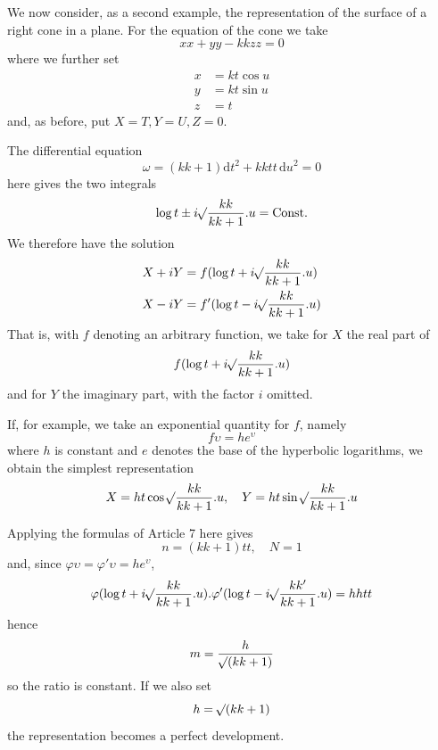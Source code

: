 We now consider, as a second example, the representation of the surface of a right cone in a plane. For the equation of the cone we take
\[
xx+yy-kkzz=0
\]
\noindent where we further set
\[
\begin{aligned}
x&=kt\cos u\\
y&=kt\sin u\\
z&=t
\end{aligned}
\]
\noindent and, as before, put \(X=T,Y=U,Z=0\).

The differential equation
\[
\omega=(kk+1)\mathrm{d}t^2+kktt\,\mathrm{d}u^2=0
\]
\noindent here gives the two integrals
\[
\log t\pm i\mathord{{}^{}\!\surd}\frac{kk}{kk+1}\mathord{.}u=\text{Const.}
\]
\noindent We therefore have the solution
\[
\begin{aligned}
X+iY&=f(\log t+i\mathord{{}^{}\!\surd}\frac{kk}{kk+1}\mathord{.}u)\\
X-iY&=f'(\log t-i\mathord{{}^{}\!\surd}\frac{kk}{kk+1}\mathord{.}u)
\end{aligned}
\]
\noindent That is, with \(f\) denoting an arbitrary function, we take for \(X\) the real part of
\[
f(\log t+i\mathord{{}^{}\!\surd}\frac{kk}{kk+1}\mathord{.}u)
\]
\noindent and for \(Y\) the imaginary part, with the factor \(i\) omitted.
\par\indent{}%
If, for example, we take an exponential quantity for \(f\), namely
\[
f\upsilon=he^{\upsilon}
\]
\noindent where \(h\) is constant and \(e\) denotes the base of the hyperbolic logarithms, we obtain the simplest representation
\[
X=ht\cos\mathord{{}^{}\!\surd}\frac{kk}{kk+1}\mathord{.}u,\quad
Y=ht\sin\mathord{{}^{}\!\surd}\frac{kk}{kk+1}\mathord{.}u
\]

Applying the formulas of Article 7 here gives
\[
n=(kk+1)tt,\quad N=1
\]
\noindent and, since \(\varphi\upsilon=\varphi'\upsilon=he^{\upsilon}\),
\[
\varphi(\log t+i\mathord{{}^{}\!\surd}\frac{kk}{kk+1}\mathord{.}u)\mathord{.}\varphi'(\log t-i\mathord{{}^{}\!\surd}\frac{kk'}{kk+1}\mathord{.}u)=hhtt
\]
\noindent hence
\[
m=\frac{h}{\mathord{{}^{}\!\surd}(kk+1)}
\]
\noindent so the ratio is constant. If we also set
\[
h=\mathord{{}^{}\!\surd}(kk+1)
\]
\noindent the representation becomes a perfect development.

